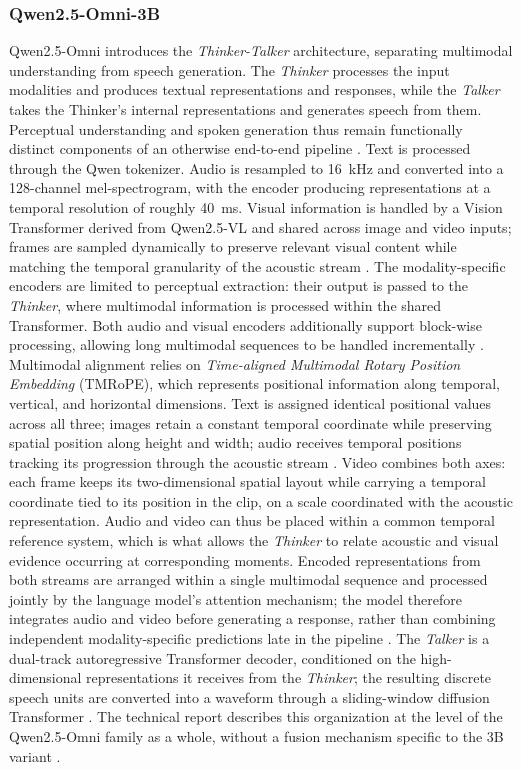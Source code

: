 \subsubsection*{Qwen2.5-Omni-3B}
Qwen2.5-Omni introduces the \textit{Thinker-Talker} architecture, separating multimodal understanding from speech generation. The \textit{Thinker} processes the input modalities and produces textual representations and responses, while the \textit{Talker} takes the Thinker's internal representations and generates speech from them. Perceptual understanding and spoken generation thus remain functionally distinct components of an otherwise end-to-end pipeline \cite{qwen25omni}.
Text is processed through the Qwen tokenizer. Audio is resampled to 16~kHz and converted into a 128-channel mel-spectrogram, with the encoder producing representations at a temporal resolution of roughly 40~ms. Visual information is handled by a Vision Transformer derived from Qwen2.5-VL and shared across image and video inputs; frames are sampled dynamically to preserve relevant visual content while matching the temporal granularity of the acoustic stream \cite{qwen25omni}.
The modality-specific encoders are limited to perceptual extraction: their output is passed to the \textit{Thinker}, where multimodal information is processed within the shared Transformer. Both audio and visual encoders additionally support block-wise processing, allowing long multimodal sequences to be handled incrementally \cite{qwen25omni}.
Multimodal alignment relies on \textit{Time-aligned Multimodal Rotary Position Embedding} (TMRoPE), which represents positional information along temporal, vertical, and horizontal dimensions. Text is assigned identical positional values across all three; images retain a constant temporal coordinate while preserving spatial position along height and width; audio receives temporal positions tracking its progression through the acoustic stream \cite{qwen25omni}.
Video combines both axes: each frame keeps its two-dimensional spatial layout while carrying a temporal coordinate tied to its position in the clip, on a scale coordinated with the acoustic representation. Audio and video can thus be placed within a common temporal reference system, which is what allows the \textit{Thinker} to relate acoustic and visual evidence occurring at corresponding moments. Encoded representations from both streams are arranged within a single multimodal sequence and processed jointly by the language model's attention mechanism; the model therefore integrates audio and video before generating a response, rather than combining independent modality-specific predictions late in the pipeline \cite{qwen25omni}.
The \textit{Talker} is a dual-track autoregressive Transformer decoder, conditioned on the high-dimensional representations it receives from the \textit{Thinker}; the resulting discrete speech units are converted into a waveform through a sliding-window diffusion Transformer \cite{qwen25omni}. The technical report describes this organization at the level of the Qwen2.5-Omni family as a whole, without a fusion mechanism specific to the 3B variant \cite{qwen25omni}.
